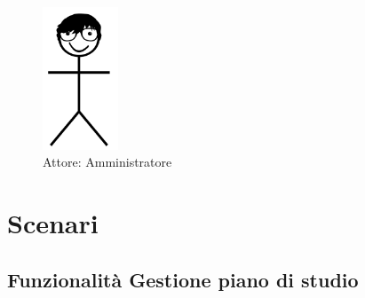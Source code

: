 \begin{figure}[h]
	\centering
	\includegraphics[width=0.2\textwidth]{imgs/attori/admin.png}
	\caption{Attore: Amministratore}
	\label{fig:Attore: Amministratore} 
\end{figure}



\newpage

\section{Scenari}
\subsection{Funzionalità Gestione piano di studio}
